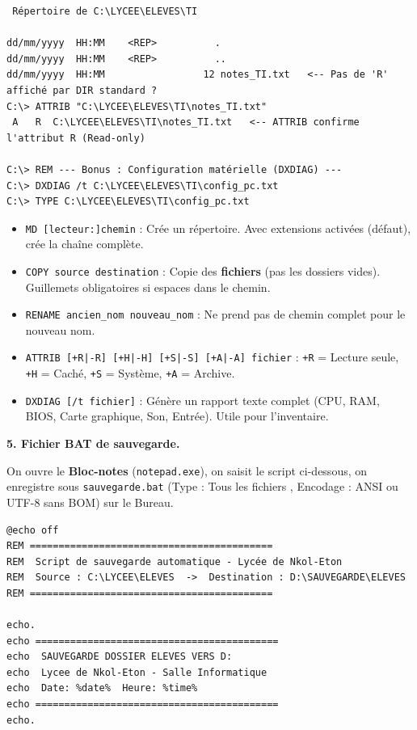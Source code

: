 \documentclass[11pt]{article}
\begin{document}
\begin{exoresolu}
\begin{lstlisting}
 Répertoire de C:\LYCEE\ELEVES\TI

dd/mm/yyyy  HH:MM    <REP>          .
dd/mm/yyyy  HH:MM    <REP>          ..
dd/mm/yyyy  HH:MM                 12 notes_TI.txt   <-- Pas de 'R' affiché par DIR standard ?
C:\> ATTRIB "C:\LYCEE\ELEVES\TI\notes_TI.txt"
 A   R  C:\LYCEE\ELEVES\TI\notes_TI.txt   <-- ATTRIB confirme l'attribut R (Read-only)

C:\> REM --- Bonus : Configuration matérielle (DXDIAG) ---
C:\> DXDIAG /t C:\LYCEE\ELEVES\TI\config_pc.txt
C:\> TYPE C:\LYCEE\ELEVES\TI\config_pc.txt
\end{lstlisting}

\begin{propriete}
\begin{itemize}
  \item \texttt{MD [lecteur:]chemin} : Crée un répertoire. Avec extensions activées (défaut), crée la chaîne complète.
  \item \texttt{COPY source destination} : Copie des \textbf{fichiers} (pas les dossiers vides). Guillemets obligatoires si espaces dans le chemin.
  \item \texttt{RENAME ancien\_nom nouveau\_nom} : Ne prend pas de chemin complet pour le nouveau nom.
  \item \texttt{ATTRIB [+R|-R] [+H|-H] [+S|-S] [+A|-A] fichier} : \texttt{+R} = Lecture seule, \texttt{+H} = Caché, \texttt{+S} = Système, \texttt{+A} = Archive.
  \item \texttt{DXDIAG [/t fichier]} : Génère un rapport texte complet (CPU, RAM, BIOS, Carte graphique, Son, Entrée). Utile pour l'inventaire.
\end{itemize}
\end{propriete}

\textbf{5. Fichier BAT de sauvegarde.}

On ouvre le \textbf{Bloc-notes} (\texttt{notepad.exe}), on saisit le script ci-dessous, on enregistre sous \texttt{sauvegarde.bat} (Type : \og Tous les fichiers \fg, Encodage : ANSI ou UTF-8 sans BOM) sur le Bureau.

\begin{lstlisting}
@echo off
REM ==========================================
REM  Script de sauvegarde automatique - Lycée de Nkol-Eton
REM  Source : C:\LYCEE\ELEVES  ->  Destination : D:\SAUVEGARDE\ELEVES
REM ==========================================

echo.
echo ==========================================
echo  SAUVEGARDE DOSSIER ELEVES VERS D:
echo  Lycee de Nkol-Eton - Salle Informatique
echo  Date: %date%  Heure: %time%
echo ==========================================
echo.


\end{lstlisting}
\end{exoresolu}
\end{document}
